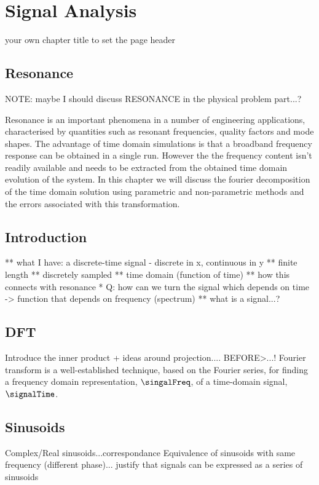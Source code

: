 \chapter{Signal Analysis}
\label{Ch:SignalAnalysis}  %
your own chapter title to set the page header

\section{Resonance} NOTE: maybe I should discuss RESONANCE in the physical
problem part...?

Resonance is an important phenomena in a number of engineering applications,
characterised by quantities such as resonant frequencies, quality factors and
mode shapes. The advantage of time domain simulations is that a broadband
frequency response can be obtained in a single run. However the the frequency
content isn't readily available and needs to be extracted from the obtained time
domain evolution of the system. In this chapter we will discuss the fourier
decomposition of the time domain solution using parametric and non-parametric
methods and the errors associated with this transformation.

\section{Introduction} ** what I have: a discrete-time signal - discrete in x,
continuous in y ** finite length ** discretely sampled ** time domain (function
of time) ** how this connects with resonance * Q: how can we turn the signal
which depends on time -> function that depends on frequency (spectrum) ** what
is a signal...?

\section{DFT}
Introduce the inner product + ideas around projection.... %
BEFORE>...! Fourier transform is a well-established technique, based on the
Fourier series, for finding a frequency domain representation, $\singalFreq$, of
a time-domain signal, $\signalTime$.


\section{Sinusoids}
Complex/Real sinusoids...correspondance Equivalence of
sinusoids with same frequency (different phase)... justify that signals can be
expressed as a series of sinusoids

